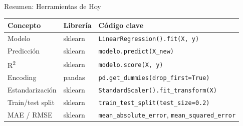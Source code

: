 \documentclass[aspectratio=169, 11pt]{beamer}
\begin{document}
\begin{frame}[shrink=5]{Resumen: Herramientas de Hoy}
  \vspace{-4pt}
  {\small
  \begin{tabular}{@{}lll@{}}
    \toprule
    \textbf{Concepto} & \textbf{Librería} & \textbf{Código clave} \\
    \midrule
    Modelo & sklearn & \texttt{LinearRegression().fit(X, y)} \\
    Predicción & sklearn & \texttt{modelo.predict(X\_new)} \\
    R\textsuperscript{2} & sklearn & \texttt{modelo.score(X, y)} \\
    Encoding & pandas & \texttt{pd.get\_dummies(drop\_first=True)} \\
    Estandarización & sklearn & \texttt{StandardScaler().fit\_transform(X)} \\
    Train/test split & sklearn & \texttt{train\_test\_split(test\_size=0.2)} \\
    MAE / RMSE & sklearn & \texttt{mean\_absolute\_error}, \texttt{mean\_squared\_error} \\
    \bottomrule
  \end{tabular}
  }
\end{frame}
\end{document}
